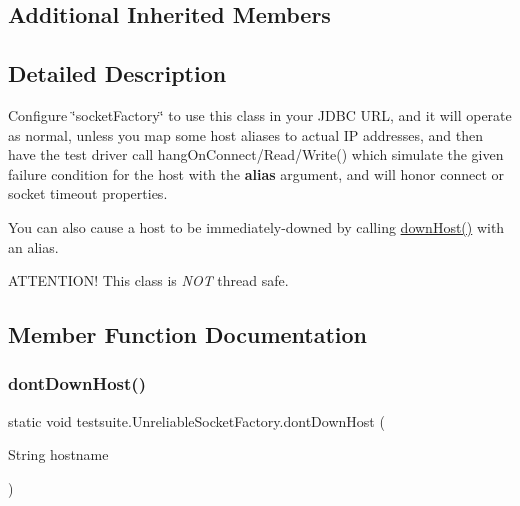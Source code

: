 \subsection*{Additional Inherited Members}


\subsection{Detailed Description}
Configure \char`\"{}socket\+Factory\char`\"{} to use this class in your J\+D\+BC U\+RL, and it will operate as normal, unless you map some host aliases to actual IP addresses, and then have the test driver call hang\+On\+Connect/\+Read/\+Write() which simulate the given failure condition for the host with the {\bfseries alias} argument, and will honor connect or socket timeout properties.

You can also cause a host to be immediately-\/downed by calling \mbox{\hyperlink{classtestsuite_1_1_unreliable_socket_factory_a83758897cf0731bbee562f9c1b10a56b}{down\+Host()}} with an alias.

A\+T\+T\+E\+N\+T\+I\+O\+N! This class is {\itshape N\+OT} thread safe. 

\subsection{Member Function Documentation}
\mbox{\label{classtestsuite_1_1_unreliable_socket_factory_a3a64f904e1088a3f094e4f983e1a5161}} 
\subsubsection{\texorpdfstring{dont\+Down\+Host()}{dontDownHost()}}
{\footnotesize\ttfamily static void testsuite.\+Unreliable\+Socket\+Factory.\+dont\+Down\+Host (\begin{DoxyParamCaption}\item[{String}]{hostname }\end{DoxyParamCaption})\hspace{0.3cm}{\ttfamily [static]}}

\mbox{\label{classtestsuite_1_1_unreliable_socket_factory_aa2a6bb8fe4d3d6eebf4c8b0e083d230e}} 
